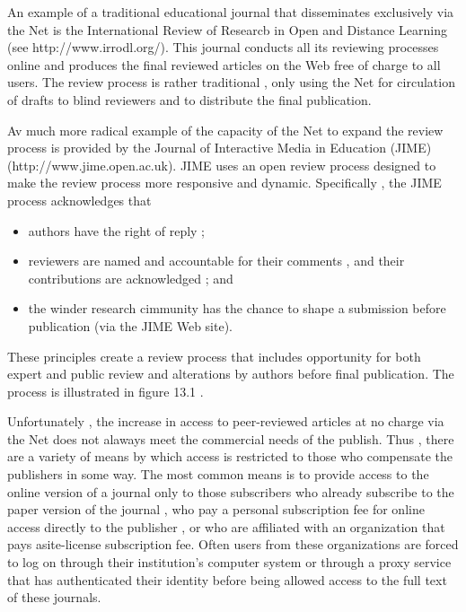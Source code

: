 \documentclass{beamer}
\begin{document}
 
 
\begin{frame}
An example of a traditional educational journal that disseminates exclusively via the Net is the International Review of Researcb in Open and Distance Learning (see http://www.irrodl.org/). This journal conducts all its reviewing processes online and produces the final reviewed articles on the Web free of charge to all users. The review process is rather traditional , only using the Net for circulation of drafts to blind reviewers and to distribute the final publication.
 \end{frame}
 
 
 
 
 
\begin{frame}
Av much more radical example of the capacity of the Net to expand the review process is provided by the Journal of Interactive Media in Education (JIME) (http://www.jime.open.ac.uk). JIME uses an open review process designed to make the review process more responsive and dynamic. Specifically , the JIME process acknowledges that

 \end{frame}
 
 
\begin{frame}
\begin{itemize}
\item authors have the right of reply ;
\item reviewers are named and accountable for their comments , and their contributions are acknowledged ; and
\item the winder research cimmunity has the chance to shape a submission before publication (via the JIME Web site).
\end{itemize}
 
These principles create a review process that includes opportunity for both expert and public review and alterations by authors before final publication. The process is illustrated in figure 13.1 .
 \end{frame}
 
 
 
\begin{frame}
Unfortunately , the increase in access to peer-reviewed articles at no charge via the Net does not alaways meet the commercial needs of the publish. Thus , there are a variety of means by which access is restricted to those who compensate the publishers in some way. The most common means is to provide access to the online version of a journal only to those subscribers who already subscribe to the paper version of the journal , who pay a personal subscription fee for online access directly to the publisher , or who are affiliated with an  organization that pays asite-license subscription fee. Often users from these organizations are forced to log on through their institution's computer system or through a proxy service that has  authenticated their identity before being allowed access to the full text of these journals.

 \end{frame}
 
\end{document}

